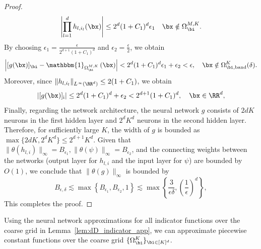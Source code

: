 \documentclass[11pt]{article}
\begin{document}
\begin{proof}
    \begin{equation*}
        \left|\prod_{l=1}^d h_{l,i_l}(\bx) \right| \leq 2^{d}(1+C_1)^{d} \epsilon_1 \quad \bx \notin \Omega_{\bi}^{M, K}.
    \end{equation*}
    By choosing $\epsilon_1 = \frac{\epsilon}{2^{d+1}(1+C_1)^d}$ and $\epsilon_2 =  \frac{\epsilon}{2}$, we obtain
    \begin{equation*}
        \left|[g(\bx)]_{\bi} - \mathbbm{1}_{\Omega_{\bi}^{M, K}} \left(\bx  \right)\right| < 2^d(1+C_1)^d \epsilon_1 + \epsilon_2 < \epsilon, \quad \bx \notin \Omega_{\bi,\mathrm{band}}^{K}(\delta).
    \end{equation*}
    Moreover, since $\|h_{l,i_l}\|_{L^{\infty}(\RR^d)} \leq 2(1+C_1)$, we obtain
    \begin{equation*}
        \left| [g(\bx)]_{\mathrm{i}} \right| \leq 2^d(1+C_1)^d + \epsilon_2 < 2^{d+1} (1+C_1)^d, \quad \bx \in \RR^d,
    \end{equation*}
    Finally, regarding the network architecture, the neural network $g$ consists of $2dK$ neurons in the first hidden layer and  $2^d K^d$  neurons in the second hidden layer. Therefore, for sufficiently large $K$, the width of $g$ is bounded as $\max\{2dK,2^d K^d\} \le 2^{d+1} K^d$. Given that $\|\theta(h_{l,i})\|_{\infty} = B_{\epsilon_1}, \|\theta(\psi)\|_{\infty} = B_{\epsilon_2}$, and the connecting weights between the networks (output layer for $h_{l,i}$ and the input layer for $\psi$)
    are bounded by $O(1)$, we conclude that $\|\theta(g)\|_{\infty}$ is bounded by 
    \begin{equation*}
        B_{\epsilon, \delta} \lesssim \max \left\{ B_{\epsilon_1}, B_{\epsilon_2}, 1\right\} \lesssim  \max \left\{  \frac{3}{\epsilon \delta}, \left( \frac{1}{\epsilon}\right)^d\right\},
    \end{equation*}
    This completes the proof.
\end{proof}


Using the neural network approximations for all indicator functions over the coarse grid in Lemma~\ref{lem:dD_indicator_app}, we can approximate piecewise constant functions over the coarse grid $\{\Omega_{\bi}^K\}_{\bi \in [K]^d}$.
\end{document}

